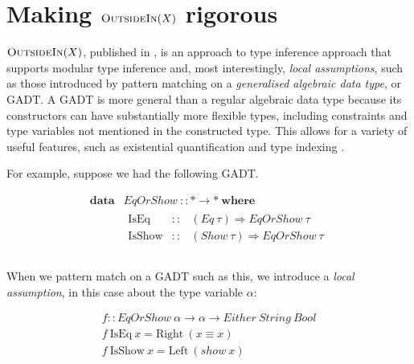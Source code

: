 \documentclass[a4paper]{jfp}
\newcommand{\outsidein}{\textsc{OutsideIn}(X)}
\begin{document}
\newpage

\section{Making $\outsidein$ rigorous}

$\outsidein$, published in \cite{Vytiniotis:2011:OMT:2139531.2139533}, is an approach to type inference approach that supports modular type inference
and, most interestingly, \emph{local assumptions}, such as those introduced by pattern matching on a \emph{generalised algebraic data type}, or GADT\@.
A GADT is more general than a regular algebraic data type because its constructors can have substantially more flexible types, including constraints
and type variables not mentioned in the constructed type. This allows for a variety of useful features, such as existential quantification and type
indexing \cite{Schrijvers:2009jg}.

For example, suppose we had the following GADT.

\begin{displaymath}
	\begin{array}{ll}		
		\textbf{data} & \mathit{EqOrShow}\ :: \mathtt{*} \rightarrow \mathtt{*}\ \textbf{where} \\
		              & \begin{array}{lcl}
                         \text{IsEq} & :: & (\mathit{Eq}\ \tau) \Rightarrow \mathit{EqOrShow}\ \tau \\
                         \text{IsShow} & :: & (\mathit{Show}\ \tau) \Rightarrow \mathit{EqOrShow}\ \tau \\
					    \end{array} \\						
     \end{array}
\end{displaymath}

\medskip

When we pattern match on a GADT such as this, we introduce a \emph{local assumption}, in this case about the type variable $\alpha$:

\begin{displaymath}
\begin{array}{ll}
\mathit{f} :: \mathit{EqOrShow}\ \alpha \rightarrow \alpha \rightarrow \mathit{Either}\ \mathit{String}\ \mathit{Bool} \\
\mathit{f}\ \text{IsEq}\  x = \text{Right}\ (x \equiv x) \\ 
\mathit{f}\  \text{IsShow}\  x = \text{Left}\ (\mathit{show}\ x)\\
\end{array}
\end{displaymath}
\end{document}
